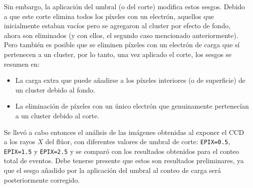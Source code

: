 Sin embargo, la aplicación del umbral (o del corte) modifica estos sesgos. Debido a que este corte elimina todos los píxeles con un electrón, aquellos que inicialmente estaban vacíos pero se agregaron al cluster por efecto de fondo, ahora son eliminados (y con ellos, el segundo caso mencionado anteriormente). Pero también es posible que se eliminen píxeles con un electrón de carga que sí pertenecen a un cluster, %
por lo tanto, una vez aplicado el corte, los sesgos se resumen en:
\begin{itemize}
    \item La carga extra que puede añadirse a los píxeles interiores (o de superficie) de un cluster debido al fondo.
    \item La eliminación de píxeles con un único electrón que genuinamente pertenecían a un cluster debido al corte.
\end{itemize}

Se llevó a cabo entonces el análisis de las imágenes obtenidas al exponer el CCD a los rayos $X$ del flúor, con diferentes valores de umbral de corte: \verb|EPIX=0.5|, \verb|EPIX=1.5| y \verb|EPIX=2.5| y se comparó con los resultados obtenidos para el conteo total de eventos. 
Debe tenerse presente que estos son resultados preliminares, ya que el sesgo añadido por la aplicación del umbral al conteo de carga será posteriormente corregido.

